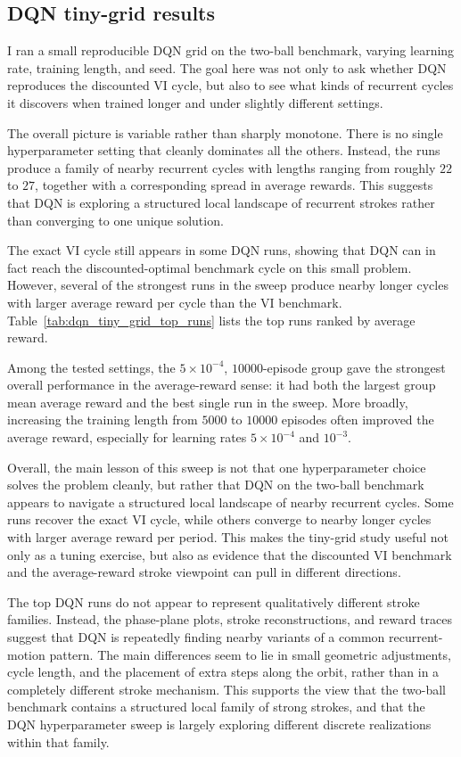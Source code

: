\documentclass{article}
\begin{document}
\subsection*{DQN tiny-grid results}

I ran a small reproducible DQN grid on the two-ball benchmark, varying learning rate, training length, and seed. The goal here was not only to ask whether DQN reproduces the discounted VI cycle, but also to see what kinds of recurrent cycles it discovers when trained longer and under slightly different settings.

The overall picture is variable rather than sharply monotone. There is no single hyperparameter setting that cleanly dominates all the others. Instead, the runs produce a family of nearby recurrent cycles with lengths ranging from roughly $22$ to $27$, together with a corresponding spread in average rewards. This suggests that DQN is exploring a structured local landscape of recurrent strokes rather than converging to one unique solution.

The exact VI cycle still appears in some DQN runs, showing that DQN can in fact reach the discounted-optimal benchmark cycle on this small problem. However, several of the strongest runs in the sweep produce nearby longer cycles with larger average reward per cycle than the VI benchmark. Table~\ref{tab:dqn_tiny_grid_top_runs} lists the top runs ranked by average reward.

Among the tested settings, the $5\times 10^{-4}$, $10000$-episode group gave the strongest overall performance in the average-reward sense: it had both the largest group mean average reward and the best single run in the sweep. More broadly, increasing the training length from $5000$ to $10000$ episodes often improved the average reward, especially for learning rates $5\times 10^{-4}$ and $10^{-3}$.

Overall, the main lesson of this sweep is not that one hyperparameter choice solves the problem cleanly, but rather that DQN on the two-ball benchmark appears to navigate a structured local landscape of nearby recurrent cycles. Some runs recover the exact VI cycle, while others converge to nearby longer cycles with larger average reward per period. This makes the tiny-grid study useful not only as a tuning exercise, but also as evidence that the discounted VI benchmark and the average-reward stroke viewpoint can pull in different directions.

The top DQN runs do not appear to represent qualitatively different stroke families. Instead, the phase-plane plots, stroke reconstructions, and reward traces suggest that DQN is repeatedly finding nearby variants of a common recurrent-motion pattern. The main differences seem to lie in small geometric adjustments, cycle length, and the placement of extra steps along the orbit, rather than in a completely different stroke mechanism. This supports the view that the two-ball benchmark contains a structured local family of strong strokes, and that the DQN hyperparameter sweep is largely exploring different discrete realizations within that family.
\end{document}
